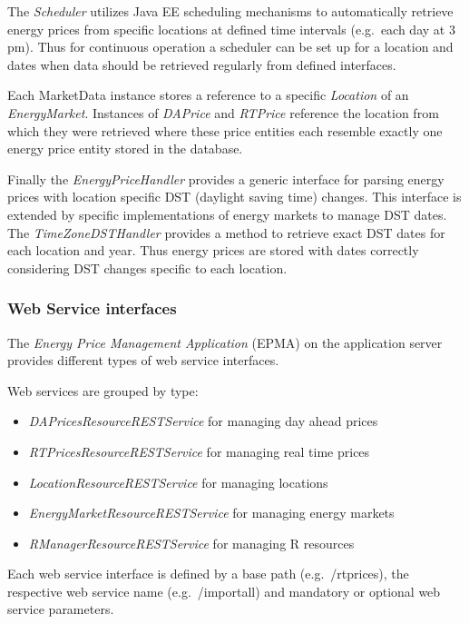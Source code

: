 The \textit{Scheduler} utilizes Java EE scheduling mechanisms to automatically retrieve energy prices from specific locations at defined time intervals (e.g.~each day at 3 pm). Thus for continuous operation a scheduler can be set up for a location and dates when data should be retrieved regularly from defined interfaces. 

Each MarketData instance stores a reference to a specific \textit{Location} of an \textit{EnergyMarket}. Instances of \textit{DAPrice} and \textit{RTPrice} reference the location from which they were retrieved where these price entities each resemble exactly one energy price entity stored in the database.

Finally the \textit{EnergyPriceHandler} provides a generic interface for parsing energy prices with location specific DST (daylight saving time) changes. This interface is extended by specific implementations of energy markets to manage DST dates. The \textit{TimeZoneDSTHandler} provides a method to retrieve exact DST dates for each location and year. Thus energy prices are stored with dates correctly considering DST changes specific to each location. 

\subsubsection{Web Service interfaces}

The \textit{Energy Price Management Application} (EPMA) on the application server provides different types of web service interfaces. 

Web services are grouped by type: 

\begin{itemize}
	\item \textit{DAPricesResourceRESTService} for managing day ahead prices
	\item \textit{RTPricesResourceRESTService} for managing real time prices
	\item \textit{LocationResourceRESTService} for managing locations
	\item \textit{EnergyMarketResourceRESTService} for managing energy markets
	\item \textit{RManagerResourceRESTService} for managing R resources
\end{itemize}

Each web service interface is defined by a base path (e.g.~/rtprices), the respective web service name (e.g.~/importall) and mandatory or optional web service parameters. 

